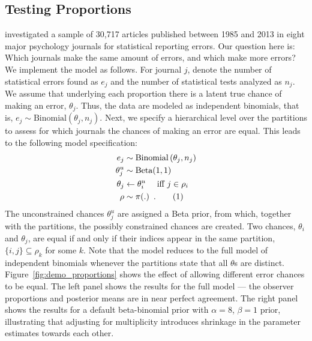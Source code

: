 \documentclass[11pt,a4paper]{article}
\theoremstyle{definition} %
\theoremstyle{case}
\newcommand{\numberthis}{\addtocounter{equation}{1}\tag{\theequation}}
\begin{document}
\subsection{Testing Proportions}
\textcite{nuijten2016prevalence} investigated a sample of 30,717 articles published between 1985 and 2013 in eight major psychology journals for statistical reporting errors. Our question here is: Which journals make the same amount of errors, and which make more errors? We implement the model as follows. For journal $j$, denote the number of statistical errors found as $e_j$ and the number of statistical tests analyzed as $n_j$. We assume that underlying each proportion there is a latent true chance of making an error, $\theta_j$. Thus, the data are modeled as independent binomials, that is, $e_j \sim \mathrm{Binomial}\left(\theta_j, n_j\right)$. Next, we specify a hierarchical level over the partitions to assess for which journals the chances of making an error are equal. This leads to the following model specification:
\begin{align*}
    e_j                 &\sim \mathrm{Binomial}\left(\theta_j, n_j\right)\\
    \theta^u_j          &\sim \text{Beta}(1, 1)\\
    \theta_j            &\leftarrow \theta^u_i \quad\text{ iff } j \in \rho_i\\
    \rho                &\sim \pi(.) \enspace . \numberthis
\end{align*}
The unconstrained chances $\theta^u_j$ are assigned a Beta prior, from which, together with the partitions, the possibly constrained chances are created. Two chances, $\theta_i$ and $\theta_j$, are equal if and only if their indices appear in the same partition, $\{i, j\} \subseteq \rho_k$ for some $k$. Note that the model reduces to the full model of independent binomials whenever the partitions state that all $\theta$s are distinct. Figure~\ref{fig:demo_proportions} shows the effect of allowing different error chances to be equal. The left panel shows the results for the full model --- the observer proportions and posterior means are in near perfect agreement. The right panel shows the results for a default beta-binomial prior with $\alpha = 8$, $\beta = 1$ prior, illustrating that adjusting for multiplicity introduces shrinkage in the parameter estimates towards each other. 
\end{document}
